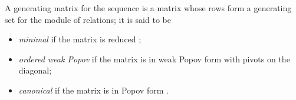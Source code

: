 \documentclass[12pt]{article}
\newcommand{\storeArg}{} %
\renewcommand{\ge}{\geqslant} %
\renewcommand{\le}{\leqslant} %
\newcommand{\NN}{\mathbb{Z}_{\ge 0}} %
\newcommand{\var}{X} %
\newcommand{\field}{\mathbb{K}} %
\newcommand{\polRing}{\field[\var]} %
\newcommand{\Pox}{[\mkern-3mu[ \var ]\mkern-3.2mu]}
\newcommand{\psRing}{\field\Pox}
\newcommand{\matSpace}[1][\rdim]{\renewcommand\storeArg{#1}\matSpaceAux} %
\newcommand{\matSpaceAux}[1][\storeArg]{\field^{\storeArg \times #1}} %
\newcommand{\polMatSpace}[1][\rdim]{\renewcommand\storeArg{#1}\polMatSpaceAux} %
\newcommand{\polMatSpaceAux}[1][\storeArg]{\polRing^{\storeArg \times #1}} %
\newcommand{\psMatSpace}[1][\rdim]{\renewcommand\storeArg{#1}\psMatSpaceAux} %
\newcommand{\psMatSpaceAux}[1][\storeArg]{\psRing^{\storeArg \times #1}} %
\newcommand{\mat}[1]{\mathbf{\MakeUppercase{#1}}} %
\newcommand{\col}[1]{\mathbf{\MakeLowercase{#1}}} %
\newcommand{\rdim}{m} %
\newcommand{\cdim}{n} %
\newcommand{\seqelt}[1]{S_{#1}} %
\newcommand{\seq}{\mathcal{S}} %
\newcommand{\seqpm}{\mat{S}} %
\newcommand{\rel}{\col{p}} %
\newcommand{\relSpace}{\polMatSpace[1][\rdim]} %
\begin{document}
A generating matrix for the sequence is a matrix whose rows form
a generating set for the module of relations; it is said to be
\begin{itemize}
  \item \emph{minimal} if the matrix is reduced \cite{Wolovich74,Kailath80};
  \item \emph{ordered weak Popov} if the matrix is in weak Popov form
    \cite{MulSto03} with pivots on the diagonal;
  \item \emph{canonical} if the matrix is in Popov form \cite{Popov72,Kailath80}.
\end{itemize}

%
%
%
\end{document}
